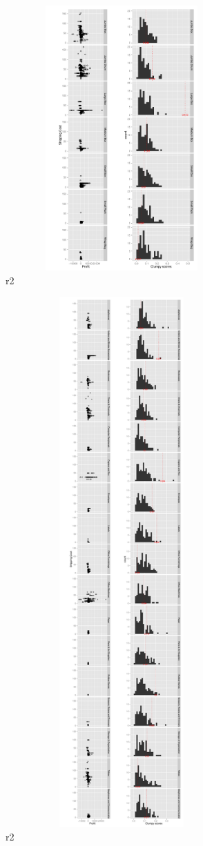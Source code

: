 \begin{figure}
\raggedleft
\includegraphics[width=3.5in,height=4in]{images/7_64436895673431-Product_Container.pdf}
  \caption{r2}
 \label{fig:r2}
\end{figure}

\begin{figure}
\raggedleft
\includegraphics[width=3.5in,height=8in]{images/3_67472603496804-Product_Sub_Category.pdf}
  \caption{r2}
 \label{fig:r2}
\end{figure}


